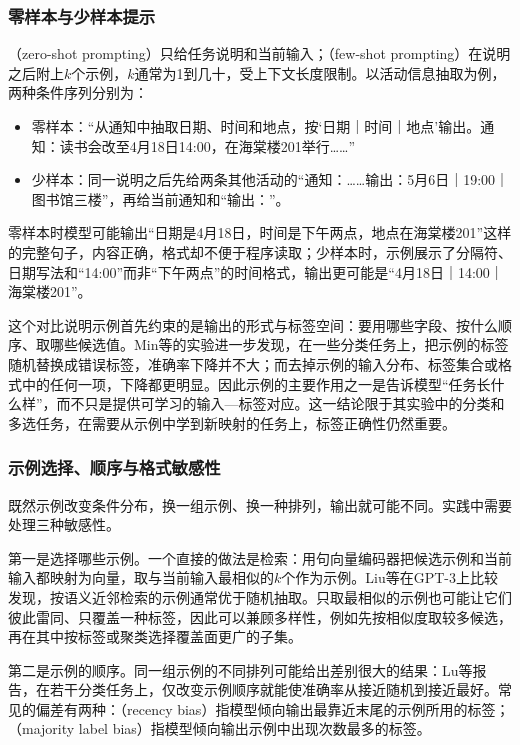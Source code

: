 \subsubsection{零样本与少样本提示}
\label{sec:nlp-inference-icl-shots}

（zero-shot prompting）只给任务说明和当前输入；（few-shot prompting）在说明之后附上$k$个示例，$k$通常为1到几十，受上下文长度限制。以活动信息抽取为例，两种条件序列分别为：
\begin{itemize}
  \item 零样本：“从通知中抽取日期、时间和地点，按‘日期｜时间｜地点’输出。通知：读书会改至4月18日14:00，在海棠楼201举行……”
  \item 少样本：同一说明之后先给两条其他活动的“通知：……输出：5月6日｜19:00｜图书馆三楼”，再给当前通知和“输出：”。
\end{itemize}
零样本时模型可能输出“日期是4月18日，时间是下午两点，地点在海棠楼201”这样的完整句子，内容正确，格式却不便于程序读取；少样本时，示例展示了分隔符、日期写法和“14:00”而非“下午两点”的时间格式，输出更可能是“4月18日｜14:00｜海棠楼201”。

这个对比说明示例首先约束的是输出的形式与标签空间：要用哪些字段、按什么顺序、取哪些候选值。Min等的实验进一步发现，在一些分类任务上，把示例的标签随机替换成错误标签，准确率下降并不大；而去掉示例的输入分布、标签集合或格式中的任何一项，下降都更明显。因此示例的主要作用之一是告诉模型“任务长什么样”，而不只是提供可学习的输入—标签对应。这一结论限于其实验中的分类和多选任务，在需要从示例中学到新映射的任务上，标签正确性仍然重要。

\subsubsection{示例选择、顺序与格式敏感性}
\label{sec:nlp-inference-icl-sensitivity}

既然示例改变条件分布，换一组示例、换一种排列，输出就可能不同。实践中需要处理三种敏感性。

第一是选择哪些示例。一个直接的做法是检索：用句向量编码器把候选示例和当前输入都映射为向量，取与当前输入最相似的$k$个作为示例。Liu等在GPT-3上比较发现，按语义近邻检索的示例通常优于随机抽取。只取最相似的示例也可能让它们彼此雷同、只覆盖一种标签，因此可以兼顾多样性，例如先按相似度取较多候选，再在其中按标签或聚类选择覆盖面更广的子集。

第二是示例的顺序。同一组示例的不同排列可能给出差别很大的结果：Lu等报告，在若干分类任务上，仅改变示例顺序就能使准确率从接近随机到接近最好。常见的偏差有两种：（recency bias）指模型倾向输出最靠近末尾的示例所用的标签；（majority label bias）指模型倾向输出示例中出现次数最多的标签。

